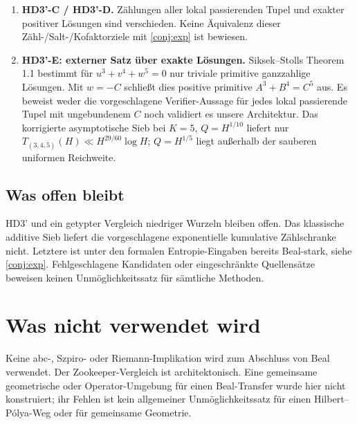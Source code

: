 \documentclass[11pt,a4paper]{article}
\begin{document}
\begin{enumerate}[leftmargin=*]
Die skalare Familie $a^x+b^y=c$ wird nach endlichem étalem Basiswechsel
$c=t^L$ auf $\mathbb G_m$, $L=\mathrm{lcm}(x,y)$, konstant:
$a=t^{L/x}u$, $b=t^{L/y}v$ reduziert auf $u^x+v^y=1$.
In Charakteristik ohne Teiler von $xy$ faktorisiert ihre geometrische
Monodromie durch eine endliche Deckgruppe; diese konkrete Familie
kann keine positivdimensionale volle symplektische Monodromiegruppe besitzen.
Keine Trivialisierung bei $c=0$, kein allgemeines Frey-Familien-No-Go
und keine Xu-Äquivalenz \cite{Xu2020,FouvryKatz2001,KatzTwistedL} folgen.
\item \textbf{HD3'-C / HD3'-D.} Zählungen aller lokal passierenden Tupel
und exakter positiver Lösungen sind verschieden. Keine Äquivalenz
dieser Zähl-/Salt-/Kofaktorziele mit \cref{conj:exp} ist bewiesen.
\item \textbf{HD3'-E: externer Satz über exakte Lösungen.}
Siksek--Stolls Theorem 1.1 \cite{SiksekStoll2012} bestimmt für
$u^3+v^4+w^5=0$ nur triviale primitive ganzzahlige Lösungen.
Mit $w=-C$ schließt dies positive primitive $A^3+B^4=C^5$ aus.
Es beweist weder die vorgeschlagene Verifier-Aussage für jedes lokal
passierende Tupel mit ungebundenem $C$ noch validiert es unsere Architektur.
Das korrigierte asymptotische Sieb bei $K=5$, $Q=H^{1/10}$ liefert nur
$T_{(3,4,5)}(H)\ll H^{29/60}\log H$; $Q=H^{1/5}$ liegt außerhalb
der sauberen uniformen Reichweite.
\end{enumerate}

\subsection*{Was offen bleibt}
HD3' und ein getypter Vergleich niedriger Wurzeln bleiben offen.
Das klassische additive Sieb liefert die vorgeschlagene exponentielle
kumulative Zählschranke nicht. Letztere ist unter den formalen
Entropie-Eingaben bereits Beal-stark, siehe \cref{conj:exp}.
Fehlgeschlagene Kandidaten oder eingeschränkte Quellensätze beweisen
keinen Unmöglichkeitssatz für sämtliche Methoden.

\section{Was nicht verwendet wird}

Keine abc-, Szpiro- oder Riemann-Implikation wird zum Abschluss von
Beal verwendet. Der Zookeeper-Vergleich ist architektonisch.
Eine gemeinsame geometrische oder Operator-Umgebung für einen
Beal-Transfer wurde hier nicht konstruiert; ihr Fehlen ist kein
allgemeiner Unmöglichkeitssatz für einen Hilbert--Pólya-Weg oder
für gemeinsame Geometrie.
\end{document}
